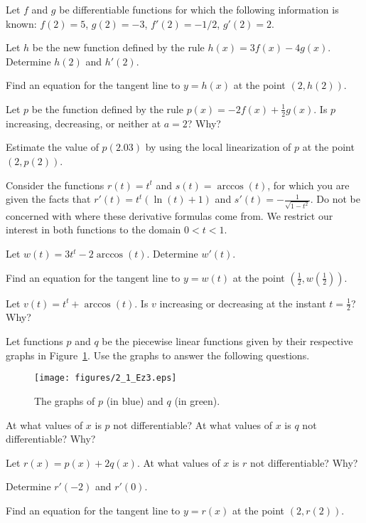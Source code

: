 \begin{exercises} 
\item Let $f$ and $g$ be differentiable functions for which the following information is known:  $f(2) = 5$, $g(2) = -3$, $f'(2) = -1/2$, $g'(2) = 2$.
\ba
	\item Let $h$ be the new function defined by the rule $h(x) = 3f(x) - 4g(x)$.  Determine $h(2)$ and $h'(2)$.
	\item Find an equation for the tangent line to $y = h(x)$ at the point $(2,h(2))$.
	\item Let $p$ be the function defined by the rule $p(x) = -2f(x) + \frac{1}{2}g(x)$.  Is $p$ increasing, decreasing, or neither at $a = 2$?  Why?
	\item Estimate the value of $p(2.03)$ by using the local linearization of $p$ at the point $(2,p(2))$.
\ea
\begin{exerciseSolution}
\end{exerciseSolution}
\item Consider the functions $r(t) = t^t$ and $s(t) = \arccos(t)$, for which you are given the facts that $r'(t) = t^t(\ln(t) + 1)$ and $s'(t) = -\frac{1}{\sqrt{1-t^2}}$.  Do not be concerned with where these derivative formulas come from.  We restrict our interest in both functions to the domain $0 < t < 1$.
\ba
	\item Let $w(t) = 3t^t - 2\arccos(t)$.  Determine $w'(t)$.
	\item Find an equation for the tangent line to $y = w(t)$ at the point $(\frac{1}{2}, w(\frac{1}{2}))$.
	\item Let $v(t) = t^t + \arccos(t)$.  Is $v$ increasing or decreasing at the instant $t = \frac{1}{2}$?  Why?
\ea
\item Let functions $p$ and $q$ be the piecewise linear functions given by their respective graphs in Figure~\ref{F:2.1.Ez3}.  Use the graphs to answer the following questions.
\begin{figure}[h]
\begin{center}
\texttt{[image: figures/2\_1\_Ez3.eps]}
\caption{The graphs of $p$ (in blue) and $q$ (in green).} \label{F:2.1.Ez3}
\end{center}
\end{figure}
\ba
	\item At what values of $x$ is $p$ not differentiable?  At what values of $x$ is $q$ not differentiable? Why?
	\item Let $r(x) = p(x) + 2q(x)$.  At what values of $x$ is $r$ not differentiable? Why?
	\item Determine $r'(-2)$ and $r'(0)$.
	\item Find an equation for the tangent line to $y = r(x)$ at the point $(2,r(2))$.
\ea


\end{exercises}
